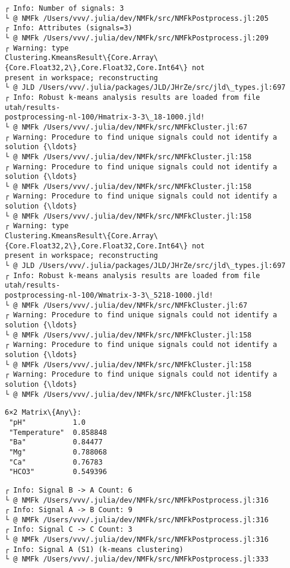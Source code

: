 \documentclass[11pt]{article}
\begin{document}
    \begin{Verbatim}[commandchars=\\\{\}]
┌ Info: Number of signals: 3
└ @ NMFk /Users/vvv/.julia/dev/NMFk/src/NMFkPostprocess.jl:205
┌ Info: Attributes (signals=3)
└ @ NMFk /Users/vvv/.julia/dev/NMFk/src/NMFkPostprocess.jl:209
┌ Warning: type
Clustering.KmeansResult\{Core.Array\{Core.Float32,2\},Core.Float32,Core.Int64\} not
present in workspace; reconstructing
└ @ JLD /Users/vvv/.julia/packages/JLD/JHrZe/src/jld\_types.jl:697
┌ Info: Robust k-means analysis results are loaded from file utah/results-
postprocessing-nl-100/Hmatrix-3-3\_18-1000.jld!
└ @ NMFk /Users/vvv/.julia/dev/NMFk/src/NMFkCluster.jl:67
┌ Warning: Procedure to find unique signals could not identify a solution {\ldots}
└ @ NMFk /Users/vvv/.julia/dev/NMFk/src/NMFkCluster.jl:158
┌ Warning: Procedure to find unique signals could not identify a solution {\ldots}
└ @ NMFk /Users/vvv/.julia/dev/NMFk/src/NMFkCluster.jl:158
┌ Warning: Procedure to find unique signals could not identify a solution {\ldots}
└ @ NMFk /Users/vvv/.julia/dev/NMFk/src/NMFkCluster.jl:158
┌ Warning: type
Clustering.KmeansResult\{Core.Array\{Core.Float32,2\},Core.Float32,Core.Int64\} not
present in workspace; reconstructing
└ @ JLD /Users/vvv/.julia/packages/JLD/JHrZe/src/jld\_types.jl:697
┌ Info: Robust k-means analysis results are loaded from file utah/results-
postprocessing-nl-100/Wmatrix-3-3\_5218-1000.jld!
└ @ NMFk /Users/vvv/.julia/dev/NMFk/src/NMFkCluster.jl:67
┌ Warning: Procedure to find unique signals could not identify a solution {\ldots}
└ @ NMFk /Users/vvv/.julia/dev/NMFk/src/NMFkCluster.jl:158
┌ Warning: Procedure to find unique signals could not identify a solution {\ldots}
└ @ NMFk /Users/vvv/.julia/dev/NMFk/src/NMFkCluster.jl:158
┌ Warning: Procedure to find unique signals could not identify a solution {\ldots}
└ @ NMFk /Users/vvv/.julia/dev/NMFk/src/NMFkCluster.jl:158
    \end{Verbatim}

    
    \begin{Verbatim}[commandchars=\\\{\}]
6×2 Matrix\{Any\}:
 "pH"           1.0
 "Temperature"  0.858848
 "Ba"           0.84477
 "Mg"           0.788068
 "Ca"           0.76783
 "HCO3"         0.549396
    \end{Verbatim}

    
    \begin{Verbatim}[commandchars=\\\{\}]
┌ Info: Signal B -> A Count: 6
└ @ NMFk /Users/vvv/.julia/dev/NMFk/src/NMFkPostprocess.jl:316
┌ Info: Signal A -> B Count: 9
└ @ NMFk /Users/vvv/.julia/dev/NMFk/src/NMFkPostprocess.jl:316
┌ Info: Signal C -> C Count: 3
└ @ NMFk /Users/vvv/.julia/dev/NMFk/src/NMFkPostprocess.jl:316
┌ Info: Signal A (S1) (k-means clustering)
└ @ NMFk /Users/vvv/.julia/dev/NMFk/src/NMFkPostprocess.jl:333
    \end{Verbatim}
\end{document}
